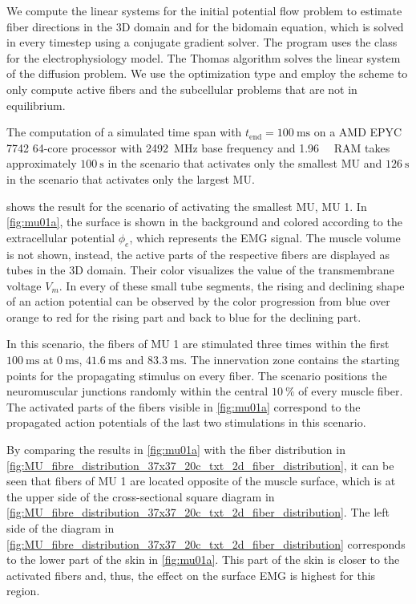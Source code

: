 We compute the linear systems for the initial potential flow problem to estimate fiber directions in the 3D domain and for the bidomain equation, which is solved in every timestep  using a conjugate gradient solver. 
The program uses the  class for the electrophysiology model. The Thomas algorithm solves the linear system of the diffusion problem. We use the  optimization type and employ the scheme to only compute active fibers and the subcellular problems that are not in equilibrium.

The computation of a simulated time span with $t_\text{end}=\SI{100}{\milli\second}$  on a  AMD EPYC 7742 64-core processor with \SI{2492}{\mega\hertz} base frequency and \SI{1.96}{\tera\byte} RAM takes approximately $\SI{100}{\second}$ in the scenario that activates only the smallest MU and $\SI{126}{\second}$ in the scenario that activates only the largest MU.

 shows the result for the scenario of activating the smallest MU, MU 1. In \cref{fig:mu01a}, the surface is shown in the background and colored according to the extracellular potential $\phi_e$, which represents the EMG signal. The muscle volume is not shown, instead, the active parts of the respective fibers are displayed as tubes in the 3D domain. Their color visualizes the value of the transmembrane voltage $V_m$. In every of these small tube segments, the rising and declining shape of an action potential can be observed by the color progression from blue over orange to red for the rising part and back to blue for the declining part.

In this scenario, the fibers of MU 1 are stimulated three times within the first $\SI{100}{\milli\second}$ at $\SI{0}{\milli\second}$, $\SI{41.6}{\milli\second}$ and $\SI{83.3}{\milli\second}$.  The innervation zone contains the starting points for the propagating stimulus on every fiber. The scenario positions the neuromuscular junctions randomly within the central $\SI{10}{\percent}$ of every muscle fiber. The activated parts of the fibers visible in \cref{fig:mu01a} correspond to the propagated action potentials of the last two stimulations in this scenario.

By comparing the results in \cref{fig:mu01a} with the fiber distribution in \cref{fig:MU_fibre_distribution_37x37_20c_txt_2d_fiber_distribution}, it can be seen that fibers of MU 1 are located opposite of the muscle surface, which is at the upper side of the cross-sectional square diagram in \cref{fig:MU_fibre_distribution_37x37_20c_txt_2d_fiber_distribution}. The left side of the diagram in \cref{fig:MU_fibre_distribution_37x37_20c_txt_2d_fiber_distribution} corresponds to the lower part of the skin in \cref{fig:mu01a}. This part of the skin is closer to the activated fibers and, thus, the effect on the surface EMG is highest for this region.

